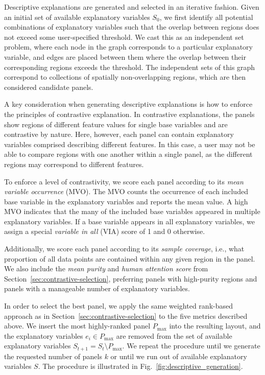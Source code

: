 \documentclass[lettersize,journal]{IEEEtran}
\begin{document}
Descriptive explanations are generated and selected in an iterative fashion.
Given an initial set of available explanatory variables $S_0$, we first identify all potential combinations of explanatory variables such that the overlap between regions does not exceed some user-specified threshold. We cast this as an independent set problem, where each node in the graph corresponds to a particular explanatory variable, and edges are placed between them where the overlap between their corresponding regions exceeds the threshold. The independent sets of this graph correspond to collections of spatially non-overlapping regions, which are then considered candidate panels.

A key consideration when generating descriptive explanations is how to enforce the principles of contrastive explanation.
In contrastive explanations, the panels show regions of different feature values for single base variables and are contrastive by nature.
Here, however, each panel can contain explanatory variables comprised describing different features. In this case, a user may not be able to compare regions with one another within a single panel, as the different regions may correspond to different features.

To enforce a level of contrastivity, we score each panel according to its \textit{mean variable occurrence} (MVO). The MVO counts the occurrence of each included base variable in the explanatory variables and reports the mean value. A high MVO indicates that the many of the included base variables appeared in multiple explanatory variables. If a base variable appears in all explanatory variables, we assign a special  \textit{variable in all} (VIA) score of 1 and 0 otherwise.

Additionally, we score each panel according to its \textit{sample coverage}, i.e., what proportion of all data points are contained within any given region in the panel. We also include the \textit{mean purity} and \textit{human attention score} from Section~\ref{sec:contrastive-selection}, preferring panels with high-purity regions and panels with a manageable number of explanatory variables.

In order to select the best panel, we apply the same weighted rank-based approach as in Section~\ref{sec:contrastive-selection} to the five metrics described above.
We insert the most highly-ranked panel $P_{\text{max}}$ into the resulting layout, and the explanatory variables $e_i \in P_{\text{max}}$ are removed from the set of available explanatory variables $S_{t + 1} = S_{t} \setminus P_{\text{max}}$. We repeat the procedure until we generate the requested number of panels $k$ or until we run out of available explanatory variables $S$. The procedure is illustrated in Fig.~\ref{fig:descriptive_generation}.
\end{document}
